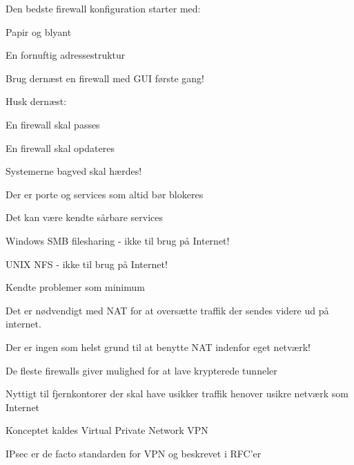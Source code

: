 \documentclass[Screen16to9,17pt]{foils}
\begin{document}
\begin{list1}
\item Den bedste firewall konfiguration starter med:
\begin{list2}
\item Papir og blyant
\item En fornuftig adressestruktur
\end{list2}
\item Brug dernæst en firewall med GUI første gang!
\item Husk dernæst:
\begin{list2}
\item En firewall skal passes
\item En firewall skal opdateres
\item Systemerne bagved skal hærdes!
\end{list2}
\end{list1}





\begin{list1}
\item Der er porte og services som altid bør blokeres
\item Det kan være kendte sårbare services
\begin{list2}
\item Windows SMB filesharing - ikke til brug på Internet!
\item UNIX NFS - ikke til brug på Internet!
\end{list2}
\item Kendte problemer som minimum
\end{list1}




\begin{list1}
\item Det er nødvendigt med NAT for at oversætte traffik der sendes videre
ud på internet.
\vskip 1cm
\item Der er ingen som helst grund til at benytte NAT indenfor eget netværk!
\end{list1}



\begin{list1}
\item De fleste firewalls giver mulighed for at lave krypterede
  tunneler
\item Nyttigt til fjernkontorer der skal have usikker traffik henover
  usikre netværk som Internet
\item Konceptet kaldes Virtual Private Network VPN
\item IPsec er de facto standarden for VPN og beskrevet i RFC'er
\end{list1}
\end{document}
